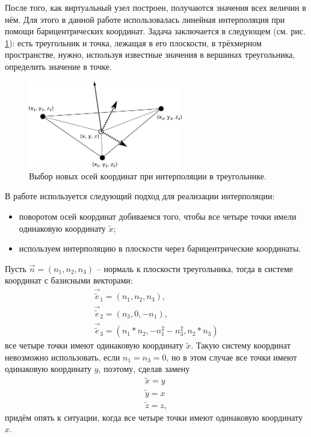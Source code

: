 После того, как виртуальный узел построен, получаются значения всех величин в нём. Для этого в данной работе использовалась линейная интерполяция при помощи барицентрических координат. Задача заключается в следующем (см. рис. \ref{pic:triangle_interpolation}): есть треугольник и точка, лежащая в его плоскости, в трёхмерном пространстве, нужно, используя известные значения в вершинах треугольника, определить значение в точке.
\begin{figure}[htp]
\centering
\includegraphics[width=0.6\textwidth]{eps/triangle_interpolation.eps}
\caption{Выбор новых осей координат при интерполяции в треугольнике.}
\label{pic:triangle_interpolation}
\end{figure}
В работе используется следующий подход для реализации интерполяции:
\begin{itemize}
	\item поворотом осей координат добиваемся того, чтобы все четыре точки имели одинаковую координату $\tilde{x}$;
	\item используем интерполяцию в плоскости через барицентрические координаты.
\end{itemize}
Пусть $\vec{n}=(n_1,n_2,n_3)$ -- нормаль к плоскости треугольника, тогда в системе координат с базисными векторами:
\begin{eqnarray}
\label{eq:new_coords}
\vec{\tilde{e}}_1=(n_1, n_2, n_3), \nonumber \\
\vec{\tilde{e}}_2=(n_3, 0, -n_1), \nonumber \\
\vec{\tilde{e}}_3=(n_1*n_2, -n_1^2-n_3^2, n_2*n_3)
\end{eqnarray}
все четыре точки имеют одинаковую координату $\tilde{x}$. Такую систему
координат невозможно использовать, если $n_1=n_3=0$, но в этом случае все точки
имеют одинаковую координату $y$, поэтому, сделав замену
\begin{eqnarray}
\label{eq:new_coords_2}
\tilde{x}=y \\
\tilde{y}=x \nonumber \\
\tilde{z}=z,
\end{eqnarray}
придём опять к ситуации, когда все четыре точки имеют одинаковую координату $x$.
